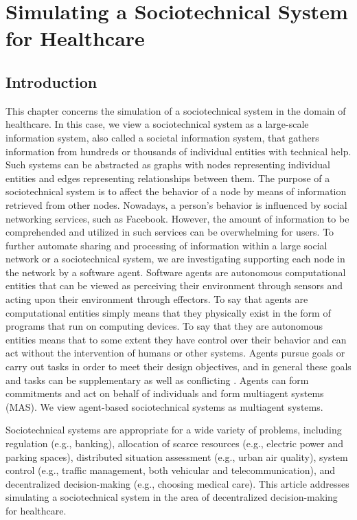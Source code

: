 \chapter{Simulating a Sociotechnical System for Healthcare}
\label{ch3}

\section{Introduction}
\label{ch3:intro}
This chapter concerns the simulation of a sociotechnical system in the domain of healthcare. In this case, we view a sociotechnical system as a large-scale information system, also called a societal information system, that gathers information from hundreds or thousands of individual entities with technical help. Such systems can be abstracted as graphs with nodes representing individual entities and edges representing relationships between them. The purpose of a sociotechnical system is to affect the behavior of a node by means of information retrieved from other nodes. Nowadays, a person's behavior is influenced by social networking services, such as Facebook. However, the amount of information to be comprehended and utilized in such services can be overwhelming for users. To further automate sharing and processing of information within a large social network or a sociotechnical system, we are investigating supporting each node in the network by a software agent. Software agents are autonomous computational entities that can be viewed as perceiving their environment through sensors and acting upon their environment through effectors. To say that agents are computational entities simply means that they physically exist in the form of programs that run on computing devices. To say that they are autonomous entities means that to some extent they have control over their behavior and can act without the intervention of humans or other systems. Agents pursue goals or carry out tasks in order to meet their design objectives, and in general these goals and tasks can be supplementary as well as conflicting \cite{huhns1999} \cite{wooldridge2009}. Agents can form commitments and act on behalf of individuals and form multiagent systems (MAS). We view agent-based sociotechnical systems as multiagent systems.

Sociotechnical systems are appropriate for a wide variety of problems, including regulation (e.g., banking), allocation of scarce resources (e.g., electric power and parking spaces), distributed situation assessment (e.g., urban air quality), system control (e.g., traffic management, both vehicular and telecommunication), and decentralized decision-making (e.g., choosing medical care). This article addresses simulating a sociotechnical system in the area of decentralized decision-making for healthcare.

